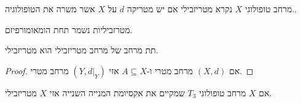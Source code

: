 \documentclass{tstextbook}
\begin{document}
\begin{definition}
מרחב טופולוגי \(X\) נקרא מטריזבילי אם יש מטריקה \(d\) על \(X\) אשר משרה את הטופולוגיה..

\end{definition}
\begin{proposition}
מטרזביליות נשמר תחת הומאומורפיזם.

\end{proposition}
\begin{proposition}
תת מרחב של מרחב מטריזבילי הוא מטריזבילי.

\end{proposition}
\begin{proof}
אם \((X,d)\) מרחב מטרי ו-\(A\subseteq X\) אזי \((Y,d|_{Y})\) מרחב מטרי.

\end{proof}
\begin{theorem}
אם \(X\) מרחב טופולוגי \(T_{3}\) שמקיים את אקסיומת המנייה השנייה אזי \(X\) מטריזבילי.

\end{theorem}
\end{document}
